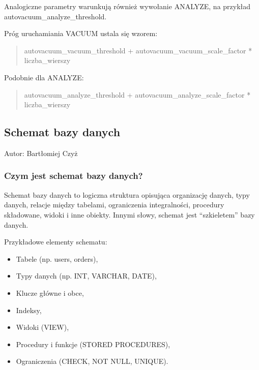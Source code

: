 \documentclass[a4paper,11pt,openany,english]{sphinxmanual}
\begin{document}
\sphinxAtStartPar
Analogiczne parametry warunkują również wywołanie ANALYZE, na przykład autovacuum\_analyze\_threshold.

\sphinxAtStartPar
Próg uruchamiania VACUUM ustala się wzorem:
\begin{quote}

\sphinxAtStartPar
autovacuum\_vacuum\_threshold + autovacuum\_vacuum\_scale\_factor * liczba\_wierszy
\end{quote}

\sphinxAtStartPar
Podobnie dla ANALYZE:
\begin{quote}

\sphinxAtStartPar
autovacuum\_analyze\_threshold + autovacuum\_analyze\_scale\_factor * liczba\_wierszy
\end{quote}


\subsection{Schemat bazy danych}
\label{\detokenize{rozdzial2/Kontrola_i_konserwacja/kontrola_i_konserwacja:schemat-bazy-danych}}
\sphinxAtStartPar
Autor: Bartłomiej Czyż


\subsubsection{Czym jest schemat bazy danych?}
\label{\detokenize{rozdzial2/Kontrola_i_konserwacja/kontrola_i_konserwacja:czym-jest-schemat-bazy-danych}}
\sphinxAtStartPar
Schemat bazy danych to logiczna struktura opisująca organizację danych, typy danych, relacje między tabelami, ograniczenia integralności, procedury składowane, widoki i inne obiekty. Innymi słowy, schemat jest “szkieletem” bazy danych.

\sphinxAtStartPar
Przykładowe elementy schematu:
\begin{itemize}
\item {} 
\sphinxAtStartPar
Tabele (np. users, orders),

\item {} 
\sphinxAtStartPar
Typy danych (np. INT, VARCHAR, DATE),

\item {} 
\sphinxAtStartPar
Klucze główne i obce,

\item {} 
\sphinxAtStartPar
Indeksy,

\item {} 
\sphinxAtStartPar
Widoki (VIEW),

\item {} 
\sphinxAtStartPar
Procedury i funkcje (STORED PROCEDURES),

\item {} 
\sphinxAtStartPar
Ograniczenia (CHECK, NOT NULL, UNIQUE).

\end{itemize}
\end{document}
